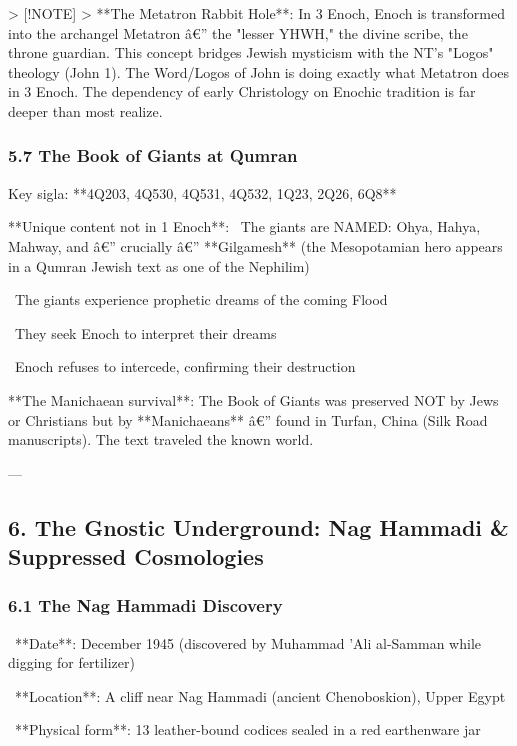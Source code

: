 \documentclass[aps,prd,11pt,onecolumn,superscriptaddress,nofootinbib,floatfix]{revtex4-2}
\begin{document}
> [!NOTE]
> **The Metatron Rabbit Hole**: In 3 Enoch, Enoch is transformed into the archangel Metatron â€'' the "lesser YHWH," the divine scribe, the throne guardian. This concept bridges Jewish mysticism with the NT's "Logos" theology (John 1). The Word/Logos of John is doing exactly what Metatron does in 3 Enoch. The dependency of early Christology on Enochic tradition is far deeper than most realize.


\subsubsection{5.7 The Book of Giants at Qumran}


Key sigla: **4Q203, 4Q530, 4Q531, 4Q532, 1Q23, 2Q26, 6Q8**


**Unique content not in 1 Enoch**:
\textbullet~The giants are NAMED: Ohya, Hahya, Mahway, and â€'' crucially â€'' **Gilgamesh** (the Mesopotamian hero appears in a Qumran Jewish text as one of the Nephilim)

\textbullet~The giants experience prophetic dreams of the coming Flood

\textbullet~They seek Enoch to interpret their dreams

\textbullet~Enoch refuses to intercede, confirming their destruction



**The Manichaean survival**: The Book of Giants was preserved NOT by Jews or Christians but by **Manichaeans** â€'' found in Turfan, China (Silk Road manuscripts). The text traveled the known world.


---


\subsection{6. The Gnostic Underground: Nag Hammadi \& Suppressed Cosmologies}


\subsubsection{6.1 The Nag Hammadi Discovery}


\textbullet~**Date**: December 1945 (discovered by Muhammad 'Ali al-Samman while digging for fertilizer)

\textbullet~**Location**: A cliff near Nag Hammadi (ancient Chenoboskion), Upper Egypt

\textbullet~**Physical form**: 13 leather-bound codices sealed in a red earthenware jar
\end{document}
